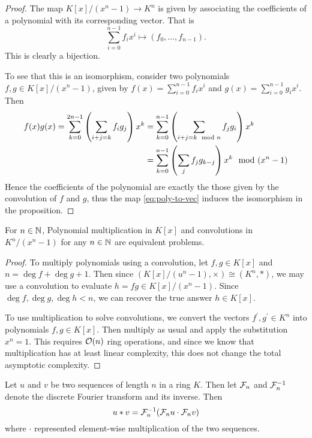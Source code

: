 \begin{proof}
    The map $K[x]/(x^n - 1) \to K^n$ is given by associating the coefficients of a polynomial with its corresponding vector. That is
    \begin{equation}\label{eq:poly-to-vec}
        \sum_{i=0}^{n-1} f_i x^i \mapsto (f_0, \ldots, f_{n-1}).
    \end{equation}
    This is clearly a bijection.

    To see that this is an isomorphism, consider two polynomials $f, g \in K[x]/(x^n - 1)$, given by $f(x) = \sum_{i=0}^{n-1} f_i x^i$ and $g(x) = \sum_{i=0}^{n-1} g_i x^i$. Then
    \begin{align*}
        f(x)g(x) = \sum^{2n-1}_{k=0} \left(\sum_{i + j = k}f_ig_j\right) x^k
        &= \sum^{n-1}_{k=0} \left(\sum_{i + j = k \mod n}f_jg_i\right) x^k\\
        &= \sum^{n-1}_{k=0} \left(\sum_j f_jg_{k-j}\right) x^k \mod (x^n - 1)
    \end{align*}
    Hence the coefficients of the polynomial are exactly the those given by the convolution of $f$ and $g$, thus the map \ref{eq:poly-to-vec} induces the isomorphism in the proposition.
\end{proof}

\begin{corollary}\label{cor:equiv-poly-conv}
    For $n \in {\mathbb N}$, Polynomial multiplication in $K[x]$ and convolutions in $K^n/(x^n - 1)$ for any $n \in {\mathbb N}$ are equivalent problems.
\end{corollary}

\begin{proof}
    To multiply polynomials using a convolution, let $f, g \in K[x]$ and $n = \deg f + \deg g + 1$. Then since $(K[x]/(u^n - 1), \times) \cong (K^n, \ast)$, we may use a convolution to evaluate $h = fg \in K[x]/(x^n -1)$. Since $\deg f, \deg g, \deg h < n$, we can recover the true answer $h \in K[x]$.

    To use multiplication to solve convolutions, we convert the vectors $f^\prime, g^\prime \in K^n$ into polynomials $f, g \in K[x]$. Then multiply as usual and apply the substitution $x^n = 1$. This requires $\mathcal O(n)$ ring operations, and since we know that multiplication has at least linear complexity, this does not change the total asymptotic complexity.
\end{proof}

\begin{definition}\label{def:convolution-property}
    Let $u$ and $v$ be two sequences of length $n$ in a ring $K$. Then let $\mathcal F_n$ and $\mathcal F_n^{-1}$ denote the discrete Fourier transform and its inverse. Then
    \[
        u \ast v = \mathcal F_n^{-1}(\mathcal F_n u \cdot \mathcal F_n v)
    \]
    where $\cdot$ represented element-wise multiplication of the two sequences.
\end{definition}

